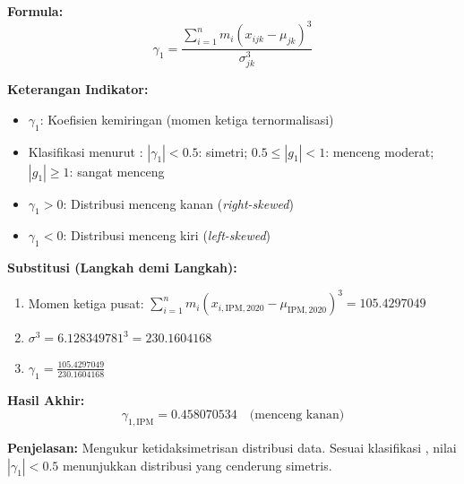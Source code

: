 \documentclass[11pt,a4paper]{article}
\begin{document}
\begin{tcolorbox}[formula_box, title={Koefisien Kemiringan (\textit{Skewness}) Populasi ($\gamma_1$)}] \label{kotak:skewness}
\textbf{Formula:}
\[ \gamma_1 = \frac{\sum_{i=1}^{n} m_i (x_{ijk} - \mu_{jk})^3}{\sigma_{jk}^3} \]

\textbf{Keterangan Indikator:}
\begin{itemize}
  \item $\gamma_1$: Koefisien kemiringan (momen ketiga ternormalisasi)
  \item Klasifikasi menurut \citet{bulmer1979}: $|\gamma_1| < 0.5$: simetri; $0.5 \leq |g_1| < 1$: menceng moderat; $|g_1| \geq 1$: sangat menceng
  \item $\gamma_1 > 0$: Distribusi menceng kanan (\textit{right-skewed})
  \item $\gamma_1 < 0$: Distribusi menceng kiri (\textit{left-skewed})
\end{itemize}

\textbf{Substitusi (Langkah demi Langkah):}
\begin{enumerate}
  \item Momen ketiga pusat: $\sum_{i=1}^{n} m_i (x_{i,\text{IPM},2020} - \mu_{\text{IPM},2020})^3 = 105.4297049$
  \item $\sigma^3 = 6.128349781^3 = 230.1604168$
  \item $\gamma_1 = \frac{105.4297049}{230.1604168}$
\end{enumerate}

\textbf{Hasil Akhir:}
\[ \gamma_{1,\text{IPM}} = 0.458070534 \quad \text{(menceng kanan)} \]

\textbf{Penjelasan:} Mengukur ketidaksimetrisan distribusi data. Sesuai klasifikasi \citet{bulmer1979}, nilai $|\gamma_1| < 0.5$ menunjukkan distribusi yang cenderung simetris.
\end{tcolorbox}
\end{document}
